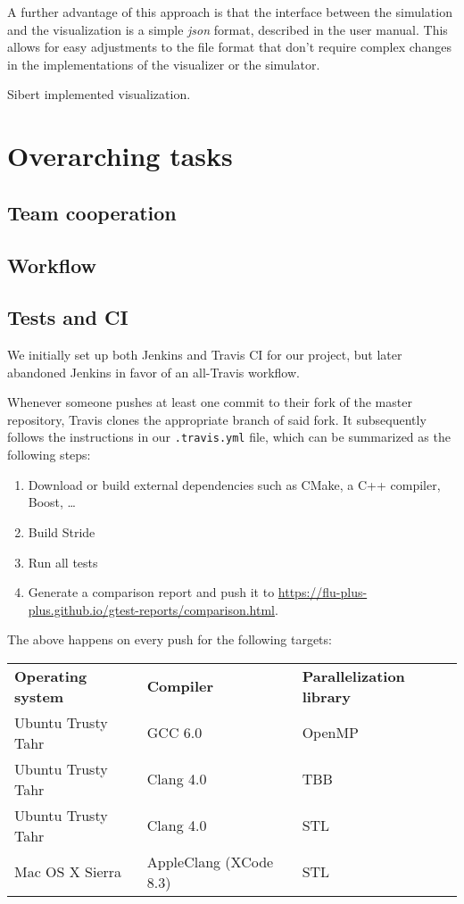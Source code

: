 \documentclass[a4paper,12pt]{article}
\begin{document}
A further advantage of this approach is that the interface between the simulation and the visualization is a simple \textit{json} format, described in the user manual. This allows for easy adjustments to the file format that don't require complex changes in the implementations of the visualizer or the simulator.

Sibert implemented visualization.

\section{Overarching tasks}
\subsection{Team cooperation} %
\subsection{Workflow} %
\subsection{Tests and CI} %

We initially set up both Jenkins and Travis CI for our project, but later abandoned Jenkins in favor of an all-Travis workflow.

Whenever someone pushes at least one commit to their fork of the master repository, Travis clones the appropriate branch of said fork. It subsequently follows the instructions in our \texttt{.travis.yml} file, which can be summarized as the following steps:

\begin{enumerate}
	\item Download or build external dependencies such as CMake, a C++ compiler, Boost, \dots
	\item Build Stride
	\item Run all tests
	\item Generate a comparison report and push it to \url{https://flu-plus-plus.github.io/gtest-reports/comparison.html}.
\end{enumerate}

The above happens on every push for the following targets:

\begin{tabular}{l|l|l}
	\textbf{Operating system} & \textbf{Compiler} & \textbf{Parallelization library} \\
	Ubuntu Trusty Tahr & GCC 6.0 & OpenMP \\
	Ubuntu Trusty Tahr & Clang 4.0 & TBB \\
	Ubuntu Trusty Tahr & Clang 4.0 & STL \\
	Mac OS X Sierra & AppleClang (XCode 8.3) & STL \\
\end{tabular}
\end{document}
